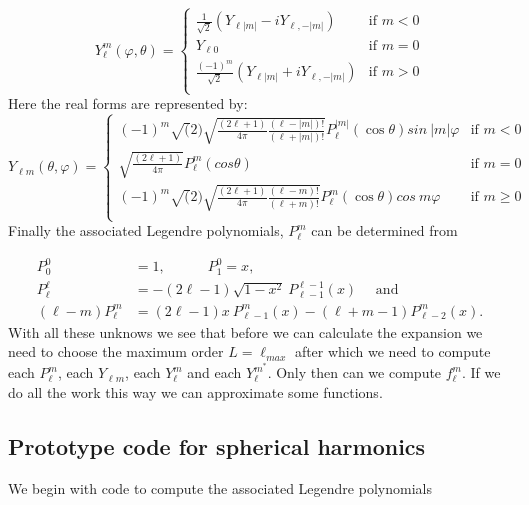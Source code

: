 \documentclass[11pt,letterpaper,titlepage]{article}
\newcommand{\beqn}{\begin{equation}
	\begin{aligned}}
\newcommand{\eeqn}{\end{aligned}
	\end{equation}}
\numberwithin{equation}{section}
\begin{document}
\begin{equation}
Y_{\ell}^m (\varphi,\theta)=
\begin{cases}
\frac{1}{\sqrt{2}} (Y_{\ell |m|}- i Y_{\ell,-|m|}) & \text{if }m<0 \\
Y_{\ell0} & \text{if } m=0 \\
\frac{(-1)^m}{\sqrt{2}} (Y_{\ell |m|}+ i Y_{\ell,-|m|}) & \text{if }m>0 \\
\end{cases}
\end{equation}
Here the real forms are represented by:
\begin{equation}\label{eq:Ylm}
Y_{\ell m} (\theta, \varphi )=
\begin{cases}
(-1)^m \sqrt(2)\sqrt{ \frac{(2\ell + 1)}{4\pi}   \frac{(\ell-|m|)!}{(\ell+|m|)!}}P_{\ell}^{|m|}(\cos\theta)sin\ {|m|\varphi}
& \text{if } m < 0 \\
\sqrt{ \frac{(2\ell + 1)}{4\pi}} P_{\ell}^{m}(cos\theta) & \text{if } m = 0 \\
(-1)^m \sqrt(2)\sqrt{ \frac{(2\ell + 1)}{4\pi}   \frac{(\ell-m)!}{(\ell+m)!}}P_{\ell}^{m}(\cos\theta)cos\ {m\varphi}
& \text{if } m \ge 0 \\
\end{cases}
\end{equation}
\newline
Finally the associated Legendre polynomials, $P_\ell^m$ can be determined from

\beqn 
P_0^0 &= 1, \quad \quad \quad
P_1^{0} = x, \\
P_\ell^\ell &= - (2\ell-1) \sqrt{1-x^2} \ P_{\ell-1}^{\ell-1}(x) \quad \text{ and}\\
(\ell - m)
P_\ell^m &= (2\ell-1)x \ P_{\ell-1}^m(x) - (\ell+m -1)P_{\ell-2}^m (x).
\eeqn
\newline
With all these unknows we see that before we can calculate the expansion we need to choose the maximum order $L=\ell_{max}$ after which we need to compute each $P_\ell^m$, each $Y_{\ell m}$, each $Y_{\ell}^m$ and each $Y_\ell^{m^*}$. Only then can we compute $f_{\ell}^m$. If we do all the work this way we can approximate some functions.

\subsection{Prototype code for spherical harmonics}
We begin with code to compute the associated Legendre polynomials
\end{document}
